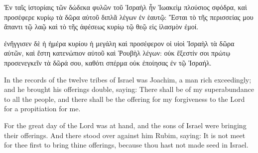 \documentclass[12pt]{article} %
\begin{document}
\begin{pairs}
\begin{Leftside}\beginnumbering\pstart
Ἐν ταῖς ἱστορίαις τῶν δώδεκα φυλῶν τοῦ Ἰσραὴλ ἦν Ἰωακεὶμ πλούσιος σφόδρα, καὶ προσέφερε κυρίῳ τὰ δῶρα αὐτοῦ διπλᾶ λέγων ἐν ἑαυτῷ: Ἔσται τὸ τῆς περισσείας μου ἅπαντι τῷ λαῷ καὶ τὸ τῆς ἀφέσεως κυρίῳ τῷ θεῷ εἰς ἱλασμὸν ἐμοί.

\pend\pstart
ἐνἤγγισεν δὲ ἡ ἡμέρα κυρίου ἡ μεγάλη καὶ προσέφερον οἱ υἱοὶ Ἰσραὴλ τὰ δῶρα αὐτῶν, καὶ ἔστη κατενώπιον αὐτοῦ καὶ Ῥουβὴλ λέγων: οὐκ ἔξεστίν σοι πρώτῳ προσενεγκεῖν τὰ δῶρά σου, καθότι σπέρμα οὐκ ἐποίησας ἐν τῷ Ἰσραήλ.

\pend\endnumbering\end{Leftside}
\begin{Rightside}\beginnumbering\pstart
In the records of the twelve tribes of Israel was Joachim, a man rich exceedingly; and he brought his offerings double, saying: There shall be of my superabundance to all the people, and there shall be the offering for my forgiveness to the Lord for a propitiation for me.

\pend\pstart
For the great day of the Lord was at hand, and the sons of Israel were bringing their offerings. And there stood over against him Rubim, saying: It is not meet for thee first to bring thine offerings, because thou hast not made seed in Israel.

\pend\endnumbering\end{Rightside}
\end{pairs}
\Columns
\end{document}
